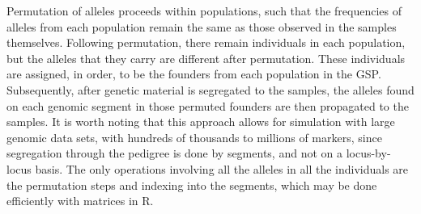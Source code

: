 Permutation of alleles proceeds within populations, such that
the frequencies of alleles from each population remain the same as those observed
in the samples themselves. Following permutation, there remain individuals
in each population, but the alleles that they carry are different after permutation.  These
individuals are assigned, in order, to be the founders from each population in the GSP. Subsequently,
after genetic material is segregated to the samples, the alleles found on each genomic segment in those permuted
founders are then propagated to the samples.  It is worth noting that this approach allows for simulation
with large genomic data sets, with hundreds of thousands to millions of markers, since segregation
through the pedigree is done by segments, and not on a locus-by-locus basis. The only operations
involving all the alleles in all the individuals are the permutation steps and indexing into the segments,
which may be done efficiently with matrices in R.

